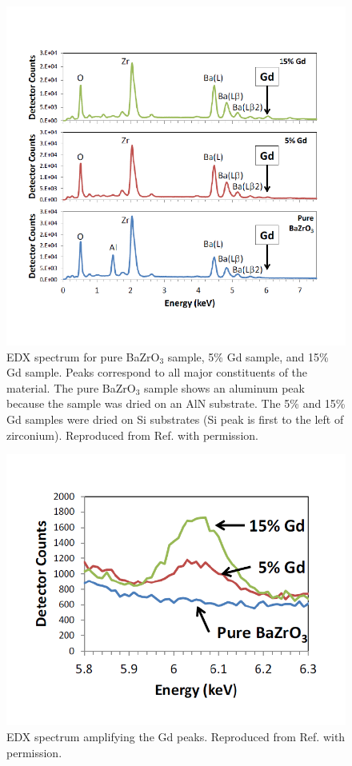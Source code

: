 \begin{figure}
    \centering
    \includegraphics[scale=.75]{Figures/Chem_EDX_1.pdf}
    \caption{EDX spectrum for pure BaZrO$_3$ sample, 5\% Gd sample, and 15\% Gd sample. Peaks correspond to all major constituents of the material. The pure BaZrO$_3$ sample shows an aluminum peak because the sample was dried on an AlN substrate. The 5\% and 15\% Gd samples were dried on Si substrates (Si peak is first to the left of zirconium). Reproduced from Ref. \cite{GCamata2015} with permission.}
    \label{fig:chem:edx_1}
\end{figure}

\begin{figure}
    \centering
    \includegraphics[scale=.75]{Figures/Chem_EDX_2.pdf}
    \caption{EDX spectrum amplifying the Gd peaks. Reproduced from Ref. \cite{GCamata2015} with permission.}
    \label{fig:chem:edx_2}
\end{figure}

